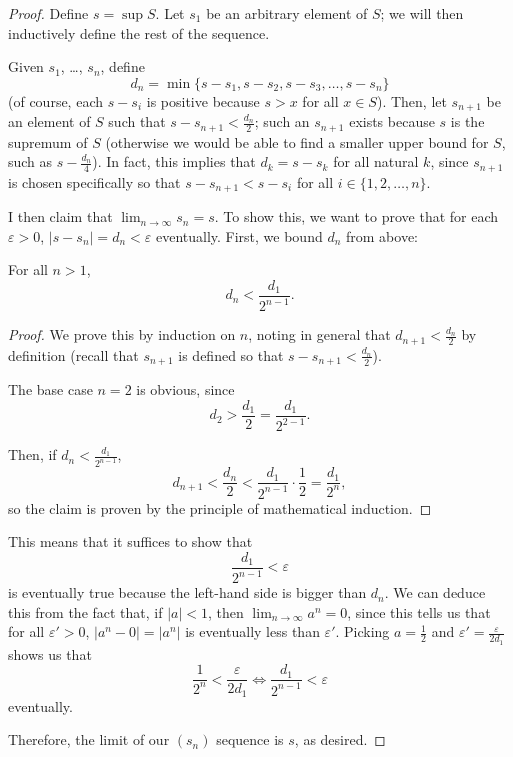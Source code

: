 \documentclass[11pt]{scrartcl}
\providecommand{\eps}{\varepsilon}
\providecommand{\half}{\frac{1}{2}}
\theoremstyle{problem}
\theoremstyle{remark}
\begin{document}
\begin{proof}
	Define $s = \sup S$.
	Let $s_1$ be an arbitrary element of $S$; we will then
	inductively define the rest of the sequence.
	
	Given $s_1$, \dots, $s_n$, define
	\[d_n = \min\{s - s_1, s - s_2, s - s_3, \dots, s - s_n\}\]
	(of course, each $s - s_i$ is positive because $s > x$ for all $x\in S$).
	Then, let $s_{n+1}$ be an element of $S$
	such that $s - s_{n+1} < \frac{d_n}{2}$; such an $s_{n+1}$ exists
	because $s$ is the supremum of $S$ (otherwise we would be able to
	find a smaller upper bound for $S$, such as $s - \frac{d_n}{4}$).
	In fact, this implies that $d_k = s - s_k$ for all natural $k$,
	since $s_{n + 1}$ is chosen specifically so that
	$s - s_{n + 1} < s - s_i$ for all $i\in\{1, 2, \dots, n\}$.
	
	I then claim that $\lim_{n\to\infty} s_n = s$.
	To show this, we want to prove that for each $\eps > 0$,
	$|s - s_n| = d_n < \eps$ eventually.
	First, we bound $d_n$ from above:
	
	\begin{claim*}
		For all $n > 1$,
		\[d_n < \frac{d_1}{2^{n - 1}}.\]
	\end{claim*}
	\begin{proof}
		We prove this by induction on $n$, noting in general that
		$d_{n+1} < \frac{d_n}{2}$ by definition
		(recall that $s_{n+1}$ is defined so that
		$s - s_{n+1} < \frac{d_n}{2}$).
		
		The base case $n = 2$ is obvious, since
		\[d_2 > \frac{d_1}{2} = \frac{d_1}{2^{2-1}}.\]
		
		Then, if $d_n < \frac{d_1}{2^{n - 1}}$,
		\[d_{n+1} < \frac{d_n}{2} < \frac{d_1}{2^{n-1}}\cdot\half
		= \frac{d_1}{2^n},\]
		so the claim is proven by the principle of mathematical induction.
	\end{proof}
	
	This means that it suffices to show that
	\[\frac{d_1}{2^{n-1}} < \eps\]
	is eventually true because the left-hand side is bigger than $d_n$.
	We can deduce this from the fact that, if $|a| < 1$,
	then $\lim_{n\to\infty} a^n = 0$, since this tells us that for all
	$\eps' > 0$, $|a^n - 0| = |a^n|$ is eventually less than $\eps'$.
	Picking $a = \half$ and $\eps' = \frac{\eps}{2d_1}$ shows us that
	\[\frac{1}{2^n} < \frac{\eps}{2d_1}
	\iff \frac{d_1}{2^{n-1}} < \eps\]
	eventually.
	
	Therefore, the limit of our $(s_n)$ sequence is $s$, as desired.
\end{proof}
\end{document}

